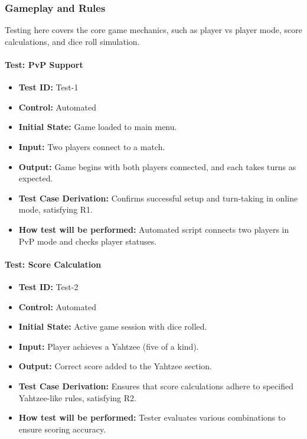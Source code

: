 \documentclass[12pt, titlepage]{article}
\begin{document}
\subsubsection{Gameplay and Rules}

Testing here covers the core game mechanics, such as player vs player mode, score calculations, and dice roll simulation.

\paragraph{Test: PvP Support}
\begin{itemize}
    \item \textbf{Test ID:} Test-1
    \item \textbf{Control:} Automated
    \item \textbf{Initial State:} Game loaded to main menu.
    \item \textbf{Input:} Two players connect to a match.
    \item \textbf{Output:} Game begins with both players connected, and each takes turns as expected.
    \item \textbf{Test Case Derivation:} Confirms successful setup and turn-taking in online mode, satisfying R1.
    \item \textbf{How test will be performed:} Automated script connects two players in PvP mode and checks player statuses.
\end{itemize}

\paragraph{Test: Score Calculation}
\begin{itemize}
    \item \textbf{Test ID:} Test-2
    \item \textbf{Control:} Automated
    \item \textbf{Initial State:} Active game session with dice rolled.
    \item \textbf{Input:} Player achieves a Yahtzee (five of a kind).
    \item \textbf{Output:} Correct score added to the Yahtzee section.
    \item \textbf{Test Case Derivation:} Ensures that score calculations adhere to specified Yahtzee-like rules, satisfying R2.
    \item \textbf{How test will be performed:} Tester evaluates various combinations to ensure scoring accuracy.
\end{itemize}
\end{document}
